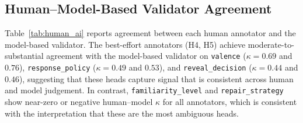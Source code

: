 \documentclass[11pt]{article}
\begin{document}
\begin{table}[tp]
\centering
\caption{Pairwise human--human Cohen's $\kappa$ for annotator pairs with $\geq$50 common turns. H1--H4 share 150 turns; pairs involving H5 share 82. Pairs are ordered by mean $\kappa$ (descending).}
\label{tab:human_human}
\footnotesize\setlength{\tabcolsep}{1.5pt}
\end{table}

\subsection{Human--Model-Based Validator Agreement}

Table~\ref{tab:human_ai} reports agreement between each human annotator and the model-based validator.
The best-effort annotators (H4, H5) achieve moderate-to-substantial agreement with the model-based validator on \texttt{valence} ($\kappa{=}0.69$ and $0.76$), \texttt{response\_policy} ($\kappa{=}0.49$ and $0.53$), and \texttt{reveal\_decision} ($\kappa{=}0.44$ and $0.46$), suggesting that these heads capture signal that is consistent across human and model judgement.
In contrast, \texttt{familiarity\_level} and \texttt{repair\_strategy} show near-zero or negative human--model $\kappa$ for all annotators, which is consistent with the interpretation that these are the most ambiguous heads.
\end{document}
